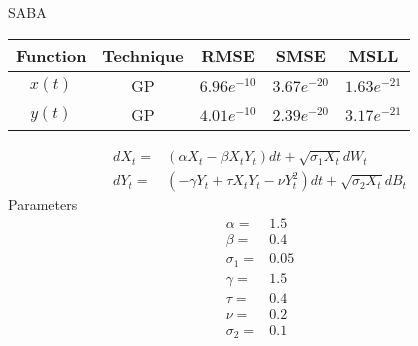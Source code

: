 SABA
\begin{table}[h!]
	\centering
	\begin{tabular}{|c|c|c|c|c|}
		\hline
		Function & Technique & RMSE          & SMSE          & MSLL          \\ \hline
		$x(t)$   & GP        & $6.96e^{-10}$ & $3.67e^{-20}$ & $1.63e^{-21}$ \\ \hline
		$y(t)$   & GP        & $4.01e^{-10}$ & $2.39e^{-20}$ & $3.17e^{-21}$ \\ \hline
	\end{tabular}
\end{table}

\begin{align*}
	dX_{t} = & (\alpha X_{t} - \beta X_{t}Y_{t}) dt + \sqrt{\sigma_{1} X_{t}} dW_{t}\\
	dY_{t} = & (-\gamma Y_{t} + \tau X_{t}Y_{t}-\nu Y_{t}^{2}) dt + \sqrt{\sigma_{2} X_{t}} dB_{t}
\end{align*}
Parameters
\begin{align*}
	\alpha = & 1.5\\
	\beta = & 0.4\\
	\sigma_{1} = & 0.05\\
	\gamma = & 1.5 \\
	\tau = & 0.4\\
	\nu = & 0.2 \\
	\sigma_{2} =&  0.1 
\end{align*}